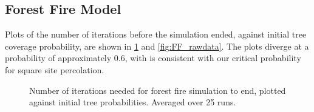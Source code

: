 \documentclass[%
 reprint,
 amsmath,amssymb,
 aps,
]{revtex4-2}
\begin{document}

\subsection{Forest Fire Model}
Plots of the number of iterations before the simulation ended, against initial tree coverage probability, are shown in \cref{fig:FF_mean} and \cref{fig:FF_rawdata}. The plots diverge at a probability of approximately 0.6, with is consistent with our critical probability for square site percolation.
\begin{figure}
    \centering
    \caption{Number of iterations needed for forest fire simulation to end, plotted against initial tree probabilities. Averaged over 25 runs.}
    \label{fig:FF_mean}
\end{figure}
\end{document}
